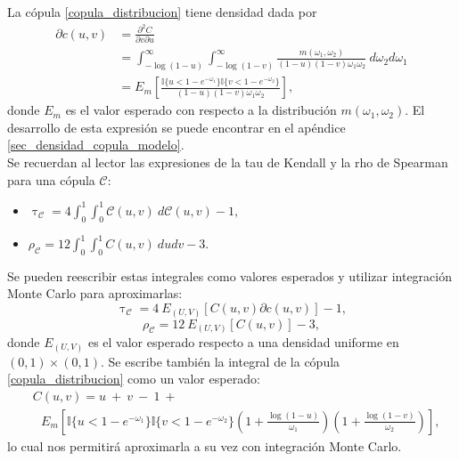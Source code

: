 \documentclass[11pt,a4paper]{article}
\newcommand{\C}{\mathcal{C}}
\begin{document}
La cópula \eqref{copula_distribucion} tiene densidad dada por
\begin{align}
\partial c(u, v) &= \frac{\partial^2C}{\partial v \partial u}\nonumber\\
&= \int_{-\log (1-u)}^\infty \int_{-\log (1-v)}^\infty \frac{m(\omega_1, \omega_2)}{(1-u)(1-v)\omega_1\omega_2} \ d\omega_2 d\omega_1 \nonumber\\
&= E_{m} \left[\frac{\mathbb{I}\lbrace u < 1-e^{-\omega_1}\rbrace \mathbb{I}\lbrace v < 1-e^{-\omega_2} \rbrace}{(1-u)(1-v)\omega_1\omega_2}\right],
\end{align}
donde $E_m$ es el valor esperado con respecto a la distribución $m(\omega_1, \omega_2)$. El desarrollo de esta expresión se puede encontrar en el apéndice \ref{sec_densidad_copula_modelo}.\\

Se recuerdan al lector las expresiones de la tau de Kendall y la rho de Spearman para una cópula $\mathcal{C}$:
\begin{itemize}
\item $\uptau_{\mathcal{C}} = 4\int_{0}^1\int_{0}^1\C(u, v) \ d\C(u, v) - 1,$\\
\item $\rho_{\mathcal{C}} = 12\int_0^1 \int_0^1 C(u, v) \ dudv-3.$
\end{itemize}
Se pueden reescribir estas integrales como valores esperados y utilizar integración Monte Carlo para aproximarlas:
\begin{equation} \label{tau_esperado}
\uptau_{\mathcal{C}} = 4 \ E_{(U, V)}\left[C(u, v) \partial c(u, v)\right] -1,
\end{equation}
\begin{equation} \label{rho_esperado}
\rho_{\mathcal{C}} = 12 \ E_{(U, V)}\left[C(u, v)\right] -3,
\end{equation}
donde $E_{(U, V)}$ es el valor esperado respecto a una densidad uniforme en \newline $(0, 1)\times (0, 1).$ Se escribe también la integral de la cópula \eqref{copula_distribucion} como un valor esperado:
\begin{align*}
&C(u, v) = u \ + \ v \ - \ 1 \ +\\
& \ \ \ E_{m} \left[\mathbb{I}\lbrace u < 1-e^{-\omega_1}\rbrace \mathbb{I}\lbrace v < 1-e^{-\omega_2}\rbrace \left(1 + \frac{\log (1-u)}{\omega_1}\right)\left(1 + \frac{\log (1-v)}{\omega_2}\right)\right],
\end{align*}
lo cual nos permitirá aproximarla a su vez con integración Monte Carlo.\\
\end{document}
